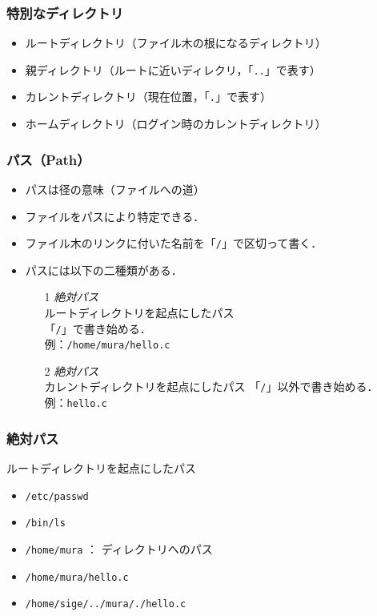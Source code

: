 \documentclass{beamer}                 %
\begin{document}
\begin{frame}[fragile]
  \frametitle{特別なディレクトリ}

  \begin{itemize}
  \item ルートディレクトリ（ファイル木の根になるディレクトリ）
  \item 親ディレクトリ（ルートに近いディレクリ，「\texttt{..}」で表す）
  \item カレントディレクトリ（現在位置，「\texttt{.}」で表す）
  \item ホームディレクトリ（ログイン時のカレントディレクトリ）
  \end{itemize}
\end{frame}

\begin{frame}[fragile]
  \frametitle{パス（Path）}
  \begin{itemize}
  \item パスは径の意味（ファイルへの道）
  \item ファイルをパスにより特定できる．
  \item ファイル木のリンクに付いた名前を「\texttt{/}」で区切って書く．
  \item パスには以下の二種類がある．
    \begin{enumerate}
    \item[1] \emph{絶対パス} \\
      ルートディレクトリを起点にしたパス\\
      「\texttt{/}」で書き始める．\\
      例：\texttt{/home/mura/hello.c}
    \item[2] \emph{絶対パス} \\
      カレントディレクトリを起点にしたパス
      「\texttt{/}」以外で書き始める．\\
      例：\texttt{hello.c}
    \end{enumerate}
  \end{itemize}
\end{frame}

\begin{frame}[fragile]
  \frametitle{絶対パス}

  ルートディレクトリを起点にしたパス
  \begin{itemize}
  \item \texttt{/etc/passwd}
  \item \texttt{/bin/ls}
  \item \texttt{/home/mura} ： ディレクトリへのパス
  \item \texttt{/home/mura/hello.c}
  \item \texttt{/home/sige/../mura/./hello.c}
  \end{itemize}
\end{frame}
\end{document}
